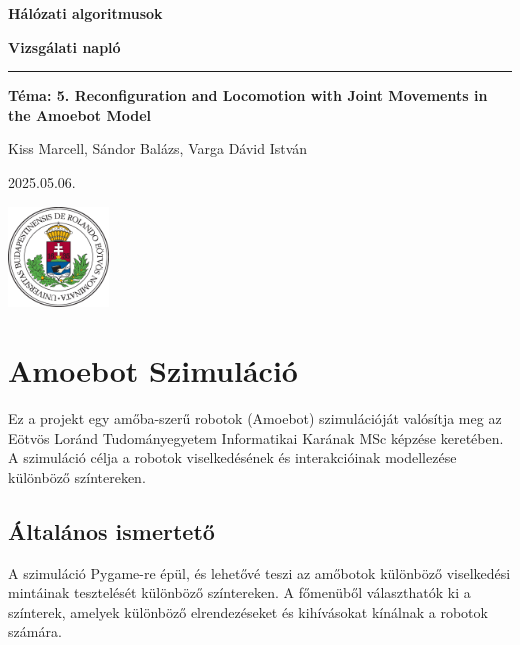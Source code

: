 \documentclass[	
  noindent
]{elteikthesis}[2024/04/26]
\begin{document}

\begin{titlepage}
  \centering
  \vspace*{3cm}
  {\Huge\bfseries Hálózati algoritmusok \par}
  {\Huge\bfseries Vizsgálati napló \par}
  
  \vspace{1cm} %
  \rule{0.8\linewidth}{0.5mm} %
  
  \vspace{1cm} %
  {\large\bfseries Téma: 5. Reconfiguration and Locomotion with Joint Movements in the Amoebot Model \par} %
  
  \vspace{6cm}
  {\Large Kiss Marcell, Sándor Balázs, Varga Dávid István  \par}
  \vspace{1cm}
  {\large 2025.05.06. \par}
  \vfill
  {\includegraphics[width=0.2\textwidth]{images/elte_cimer_szines.eps}\par}
\end{titlepage}


\tableofcontents

\chapter{Amoebot Szimuláció}
Ez a projekt egy amőba-szerű robotok (Amoebot) szimulációját valósítja meg az Eötvös Loránd Tudományegyetem Informatikai Karának MSc képzése keretében. A szimuláció célja a robotok viselkedésének és interakcióinak modellezése különböző színtereken.

\section{Általános ismertető}

A szimuláció Pygame-re épül, és lehetővé teszi az amőbotok különböző viselkedési mintáinak tesztelését különböző színtereken. A főmenüből választhatók ki a színterek, amelyek különböző elrendezéseket és kihívásokat kínálnak a robotok számára.
\end{document}
